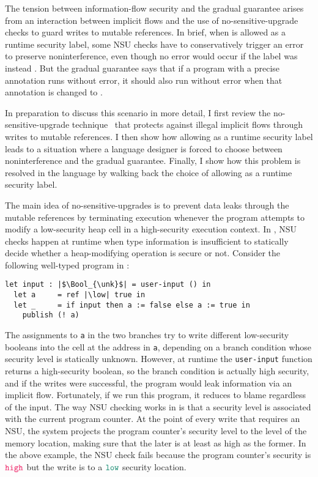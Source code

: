 
The tension between information-flow security and the gradual guarantee arises
from an interaction between implicit flows and the use of no-sensitive-upgrade
checks to guard writes to mutable references. In brief, when \unk is allowed as
a runtime security label, some NSU checks have to conservatively trigger an
error to preserve noninterference, even though no error would occur if the label
was instead \high. But the gradual guarantee says that if a program with a
precise annotation runs without error, it should also run without error when
that annotation is changed to \unk.

In preparation to discuss this scenario in more detail, I first review the
no-sensitive-upgrade technique~\parencite{austin2009efficient} that protects against
illegal implicit flows through writes to mutable references. I then show how
allowing \unk as a runtime security label leads to a situation where a language
designer is forced to choose between noninterference and the gradual guarantee.
Finally, I show how this problem is resolved in the \Surface language by walking
back the choice of allowing \unk as a runtime security label.

The main idea of no-sensitive-upgrades is to prevent data leaks through the
mutable references by terminating execution whenever the program attempts to
modify a low-security heap cell in a high-security execution context. In
\Surface, NSU checks happen at runtime when type information is insufficient to
statically decide whether a heap-modifying operation is secure or not. Consider
the following well-typed program in \Surface:

\begin{lstlisting}[style=tt]
  let input : |$\Bool_{\unk}$| = user-input () in
  let a     = ref |\low| true in
  let _     = if input then a := false else a := true in
    publish (! a)
\end{lstlisting}

\noindent
The assignments to \texttt{a} in the two branches try to write different
low-security booleans into the cell at the address in \texttt{a}, depending on a
branch condition whose security level is statically unknown. However, at runtime
the \texttt{user-input} function returns a high-security boolean, so the branch
condition is actually high security, and if the writes were successful, the
program would leak information via an implicit flow. Fortunately, if we run this
program, it reduces to blame regardless of the input. The way NSU checking works
in \Surface is that a security level is associated with the current program
counter. At the point of every write that requires an NSU, the system projects
the program counter's security level to the level of the memory location, making
sure that the later is at least as high as the former. In the above example, the
NSU check fails because the program counter's security is $\high$ but the write
is to a $\low$ security location.

